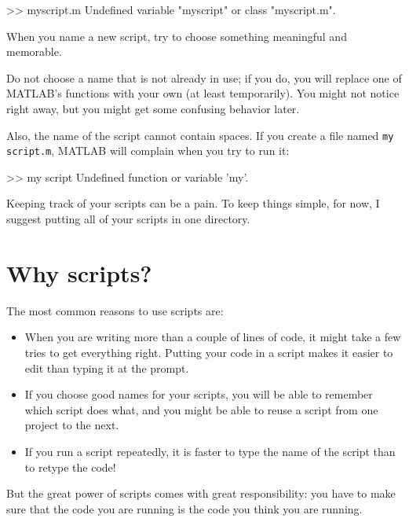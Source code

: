 \documentclass[
]{book}
\numberwithin{Answer}{chapter}
\numberwithin{Exercise}{chapter}
\begin{document}
\begin{code}
>> myscript.m
Undefined variable "myscript" or class "myscript.m".
\end{code}

When you name a new script, try to choose something meaningful and memorable. 

Do not choose a name that is not already in use; if you do, you will replace one of MATLAB's functions with your own (at least temporarily).
You might not notice right away, but you might get some confusing behavior later.

Also, the name of the script cannot contain spaces.  If you create
a file named {\tt my script.m}, MATLAB will complain when you try
to run it:

\begin{code}
>> my script
Undefined function or variable 'my'.
\end{code}

Keeping track of your scripts can be a pain.  To keep things simple,
for now, I suggest putting all of your scripts in one
directory.


\section{Why scripts?}

The most common reasons to use scripts are:


\begin{itemize}

\item When you are writing more than a couple of lines of code, it
might take a few tries to get everything right.  Putting your code
in a script makes it easier to edit than typing it at the prompt.

\item If you choose good names for your scripts, you will be able
to remember which script does what, and you might be able to reuse
a script from one project to the next.

\item If you run a script repeatedly, it is faster to type the
name of the script than to retype the code!

\end{itemize}

But the great power of scripts comes with great responsibility:
you have to make sure that the code you are running is the code you think you are running.
\end{document}
